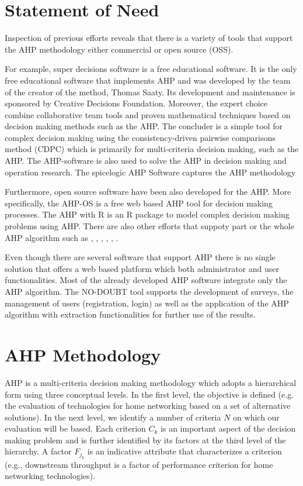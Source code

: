 \documentclass{article}
\begin{document}
\section*{Statement of Need}
Inspection of previous efforts reveals that there is a variety of tools that support the AHP methodology either commercial or open source (OSS). 

For example, super decisions software \citep{Superdecisions} is a free educational software. It is the only free educational software that implements AHP and was developed by the team of the creator of the method, Thomas Saaty. Its development and maintenance is sponsored by Creative Decisions Foundation.
Moreover, the expert choice \citep{Expertchoice} combine collaborative team tools and proven mathematical techniques based on decision making methods such as the AHP. 
The concluder \citep{Concluder} is a simple tool for complex decision making using the consistency-driven pairwise comparisons method (CDPC) which is primarily for multi-criteria decision making, such as the AHP. 
The AHP-software \citep{AHP-Software} is also used to solve the AHP in decision making and operation research. The spicelogic AHP Software \citep{AHP_Software}  captures the AHP methodology

Furthermore, open source software have been also developed for the AHP. More specifically,  the AHP-OS \citep{AHP-OS} is a free web based AHP tool for decision making processes. 
The AHP with R \citep{AHP-R} is an R package to model complex decision making problems using AHP. There are also other efforts that suppoty part or the whole AHP algorithm such as  \citep{Paulgovan}, \citep{Andrugo}, \citep{Airiyu}, \citep{Humberoroa}, \citep{Pvlhx}, \citep{Hogivano}. 

Even though there are several software that support AHP there is no single solution that offers a web based platform which both administrator and user functionalities. Most of the already developed AHP software integrate only the AHP algorithm. The NO-DOUBT tool supports the development of surveys, the management of users (registration, login) as well as the application of the AHP algorithm with extraction functionalities for further use of the results.  

\section*{AHP Methodology}
AHP is a multi-criteria decision making methodology which adopts a hierarchical form using three conceptual levels. In the first level, the objective is defined (e.g. the evaluation of technologies for home networking based on a set of alternative solutions). In the next level, we identify a number of criteria $N$ on which our evaluation will be based. Each criterion $C_k$ is an important aspect of the decision making problem and is further identified by its factors at the third level of the hierarchy. A factor $F_{j_k}$ is an indicative attribute that characterizes a criterion (e.g., downstream throughput is a factor of performance criterion for home networking technologies). 
\end{document}
